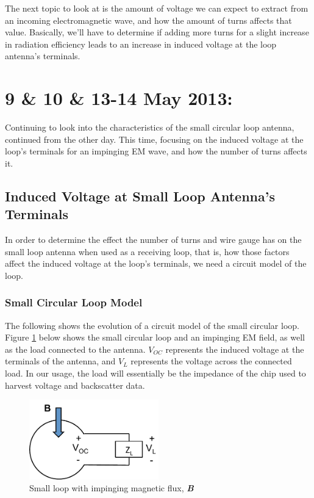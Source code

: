 \documentclass[12pt,onecolumn,titlepage]{article}
\begin{document}
The next topic to look at is the amount of voltage we can expect to extract from an incoming electromagnetic wave, and how the amount of turns affects that value. Basically, we'll have to determine if adding more turns for a slight increase in radiation efficiency leads to an increase in induced voltage at the loop antenna's terminals.




\clearpage
\section{9 \& 10 \& 13-14 May 2013:}

\indent \indent Continuing to look into the characteristics of the small circular loop antenna, continued from the other day. This time, focusing on the induced voltage at the loop's terminals for an impinging EM wave, and how the number of turns affects it.

\subsection{Induced Voltage at Small Loop Antenna's Terminals}
\indent \indent In order to determine the effect the number of turns and wire gauge has on the small loop antenna when used as a receiving loop, that is, how those factors affect the induced voltage at the loop's terminals, we need a circuit model of the loop.

\subsubsection{Small Circular Loop Model}
\indent \indent The following shows the evolution of a circuit model of the small circular loop. Figure \ref{fig:loop_mag_field_load} below shows the small circular loop and an impinging EM field, as well as the load connected to the antenna. $V_{OC}$ represents the induced voltage at the terminals of the antenna, and $V_L$ represents the voltage across the connected load. In our usage, the load will essentially be the impedance of the chip used to harvest voltage and backscatter data.

\begin{figure}[htbp]
	\centering
	\includegraphics[width=0.5\textwidth]{Pictures/9May2013/loop_mag_field_load}
	\caption{Small loop with impinging magnetic flux, {\bf{\emph{B}}} } 
	\label{fig:loop_mag_field_load}
\end{figure}
\end{document}
